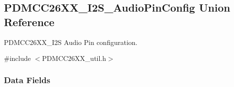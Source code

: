 \subsection{P\+D\+M\+C\+C26\+X\+X\+\_\+\+I2\+S\+\_\+\+Audio\+Pin\+Config Union Reference}
\label{union_p_d_m_c_c26_x_x___i2_s___audio_pin_config}


P\+D\+M\+C\+C26\+X\+X\+\_\+\+I2\+S Audio Pin configuration.  




{\ttfamily \#include $<$P\+D\+M\+C\+C26\+X\+X\+\_\+util.\+h$>$}

\subsubsection*{Data Fields}
